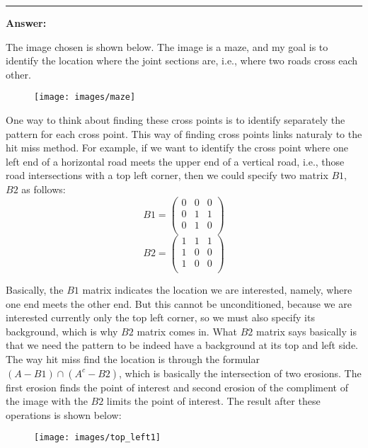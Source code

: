 \documentclass[conference]{styles/acmsiggraph}
\newenvironment{answer}{}{}
\begin{document}
\begin{answer}
	\rule{\textwidth}{0.4pt}
	
	\textbf{Answer:}

	The image chosen is shown below. The image is a maze, and my goal is to identify the location where the joint sections are, i.e., where two roads cross each other. 
	\begin{figure}[H]
		\centering
		\texttt{[image: images/maze]}
		\end{figure}	

	One way to think about finding these cross points is to identify separately the pattern for each cross point. This way of finding cross points links naturaly to the hit miss method. For example, if we want to identify the cross point where one left end of a horizontal road meets the upper end of a vertical road, i.e., those road intersections with a top left corner, then we could specify two matrix $B1$, $B2$ as follows:
	$$B1 = \begin{pmatrix}
		0 & 0 & 0\\
		0 & 1 & 1\\
		0 & 1 & 0\\
	\end{pmatrix}$$
	$$B2 = \begin{pmatrix}
		1 & 1 & 1\\
		1 & 0 & 0\\
		1 & 0 & 0\\
	\end{pmatrix}$$

	Basically, the $B1$ matrix indicates the location we are interested, namely, where one end meets the other end. But this cannot be unconditioned, because we are interested currently only the top left corner, so we must also specify its background, which is why $B2$ matrix comes in. What $B2$ matrix says basically is that we need the pattern to be indeed have a background at its top and left side. The way hit miss find the location is through the formular $(A - B1) \cap (A^c -  B2)$, which is basically the intersection of two erosions. The first erosion finds the point of interest and second erosion of the compliment of the image with the $B2$ limits the point of interest. The result after these operations is shown below:
	\begin{figure}[H]
		\centering
		\texttt{[image: images/top\_left1]}
		\end{figure}	


\end{answer}
\end{document}
